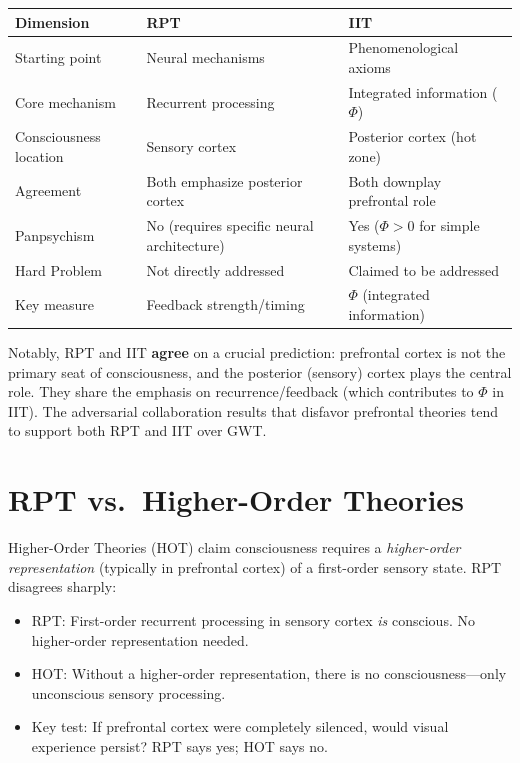 \documentclass[11pt,a4paper]{report}
\begin{document}
\begin{compbox}
\renewcommand{\arraystretch}{1.4}
\begin{tabular}{>{\raggedright}p{3cm} >{\raggedright}p{5cm} >{\raggedright\arraybackslash}p{5cm}}
  \toprule
  \textbf{Dimension} & \textbf{RPT} & \textbf{IIT} \\
  \midrule
  Starting point & Neural mechanisms & Phenomenological axioms \\
  Core mechanism & Recurrent processing & Integrated information ($\Phi$) \\
  Consciousness location & Sensory cortex & Posterior cortex (hot zone) \\
  Agreement & Both emphasize posterior cortex & Both downplay prefrontal role \\
  Panpsychism & No (requires specific neural architecture) & Yes ($\Phi > 0$ for simple systems) \\
  Hard Problem & Not directly addressed & Claimed to be addressed \\
  Key measure & Feedback strength/timing & $\Phi$ (integrated information) \\
  \bottomrule
\end{tabular}
\end{compbox}

Notably, RPT and IIT \textbf{agree} on a crucial prediction: prefrontal cortex is not the primary seat of consciousness, and the posterior (sensory) cortex plays the central role. They share the emphasis on recurrence/feedback (which contributes to $\Phi$ in IIT). The adversarial collaboration results that disfavor prefrontal theories tend to support both RPT and IIT over GWT.

\section{RPT vs.\ Higher-Order Theories}

Higher-Order Theories (HOT) claim consciousness requires a \emph{higher-order representation} (typically in prefrontal cortex) of a first-order sensory state. RPT disagrees sharply:

\begin{itemize}[leftmargin=1.5em]
  \item RPT: First-order recurrent processing in sensory cortex \emph{is} conscious. No higher-order representation needed.
  \item HOT: Without a higher-order representation, there is no consciousness---only unconscious sensory processing.
  \item Key test: If prefrontal cortex were completely silenced, would visual experience persist? RPT says yes; HOT says no.
\end{itemize}
\end{document}
